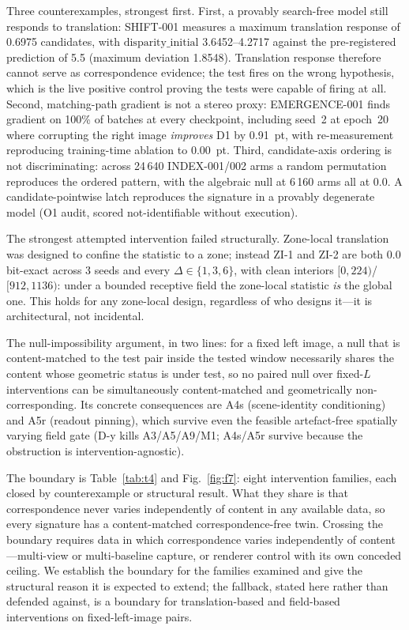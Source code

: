 \documentclass[conference]{IEEEtran}
\begin{document}
Three counterexamples, strongest first. First, a provably search-free model still responds to translation: SHIFT-001 measures a maximum translation response of 0.6975 candidates, with $\mathrm{disparity\_initial}$ 3.6452--4.2717 against the pre-registered prediction of 5.5 (maximum deviation 1.8548). Translation response therefore cannot serve as correspondence evidence; the test fires on the wrong hypothesis, which is the live positive control proving the tests were capable of firing at all. Second, matching-path gradient is not a stereo proxy: EMERGENCE-001 finds gradient on 100\% of batches at every checkpoint, including seed~2 at epoch~20 where corrupting the right image \emph{improves} D1 by 0.91~pt, with re-measurement reproducing training-time ablation to 0.00~pt. Third, candidate-axis ordering is not discriminating: across 24\,640 INDEX-001/002 arms a random permutation reproduces the ordered pattern, with the algebraic null at 6\,160 arms all at 0.0. A candidate-pointwise latch reproduces the signature in a provably degenerate model (O1 audit, scored not-identifiable without execution).

The strongest attempted intervention failed structurally. Zone-local translation was designed to confine the statistic to a zone; instead ZI-1 and ZI-2 are both 0.0 bit-exact across 3 seeds and every $\Delta\in\{1,3,6\}$, with clean interiors $[0,224)$/$[912,1136)$: under a bounded receptive field the zone-local statistic \emph{is} the global one. This holds for any zone-local design, regardless of who designs it---it is architectural, not incidental.

The null-impossibility argument, in two lines: for a fixed left image, a null that is content-matched to the test pair inside the tested window necessarily shares the content whose geometric status is under test, so no paired null over fixed-$L$ interventions can be simultaneously content-matched and geometrically non-corresponding. Its concrete consequences are A4s (scene-identity conditioning) and A5r (readout pinning), which survive even the feasible artefact-free spatially varying field gate (D-y kills A3/A5/A9/M1; A4s/A5r survive because the obstruction is intervention-agnostic).

The boundary is Table~\ref{tab:t4} and Fig.~\ref{fig:f7}: eight intervention families, each closed by counterexample or structural result. What they share is that correspondence never varies independently of content in any available data, so every signature has a content-matched correspondence-free twin. Crossing the boundary requires data in which correspondence varies independently of content---multi-view or multi-baseline capture, or renderer control with its own conceded ceiling. We establish the boundary for the families examined and give the structural reason it is expected to extend; the fallback, stated here rather than defended against, is a boundary for translation-based and field-based interventions on fixed-left-image pairs.
\end{document}
